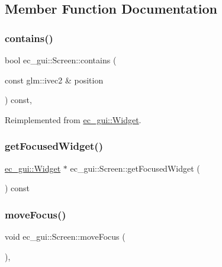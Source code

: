 \subsection{Member Function Documentation}
\mbox{\label{classec__gui_1_1_screen_a0948bb5fb9286b2c95045282f21f21cc}} 
\subsubsection{\texorpdfstring{contains()}{contains()}}
{\footnotesize\ttfamily bool ec\+\_\+gui\+::\+Screen\+::contains (\begin{DoxyParamCaption}\item[{const glm\+::ivec2 \&}]{position }\end{DoxyParamCaption}) const\hspace{0.3cm}{\ttfamily [override]}, {\ttfamily [virtual]}}



Reimplemented from \mbox{\hyperlink{classec__gui_1_1_widget_a90f689c8153f17454ce2d52458703a26}{ec\+\_\+gui\+::\+Widget}}.

\mbox{\label{classec__gui_1_1_screen_ad61162c9b00737f13cdd4ea868a91839}} 
\subsubsection{\texorpdfstring{get\+Focused\+Widget()}{getFocusedWidget()}}
{\footnotesize\ttfamily \mbox{\hyperlink{classec__gui_1_1_widget}{ec\+\_\+gui\+::\+Widget}} $\ast$ ec\+\_\+gui\+::\+Screen\+::get\+Focused\+Widget (\begin{DoxyParamCaption}{ }\end{DoxyParamCaption}) const}

\mbox{\label{classec__gui_1_1_screen_a7f641a6e7331d1f9f2f07997961a4568}} 
\subsubsection{\texorpdfstring{move\+Focus()}{moveFocus()}}
{\footnotesize\ttfamily void ec\+\_\+gui\+::\+Screen\+::move\+Focus (\begin{DoxyParamCaption}{ }\end{DoxyParamCaption})\hspace{0.3cm}{\ttfamily [override]}, {\ttfamily [virtual]}}



